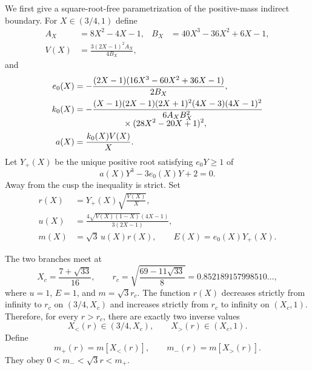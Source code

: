 \documentclass[aps,prb,preprint,superscriptaddress,nofootinbib]{revtex4-2}
\begin{document}
We first give a square-root-free parametrization of the positive-mass
indirect boundary.  For $X\in(3/4,1)$ define
\begin{align}
A_X&=8X^2-4X-1,&
B_X&=40X^3-36X^2+6X-1,\nonumber\\
V(X)&=\frac{3(2X-1)^2A_X}{4B_X},
\label{eq:V}\end{align}
and
\begin{align}
e_0(X)&=-\frac{(2X-1)(16X^3-60X^2+36X-1)}{2B_X},\label{eq:e0}\\
k_0(X)&=-\frac{(X-1)(2X-1)(2X+1)^2(4X-3)(4X-1)^2}
{6A_XB_X^2}
\nonumber\\[-2mm]
&\hspace{20mm}\times(28X^2-20X+1)^2,\label{eq:k0}\\
a(X)&=\frac{k_0(X)V(X)}{X}.
\end{align}
Let $Y_+(X)$ be the unique positive root satisfying $e_0Y\geq1$ of
\begin{equation}
a(X)Y^3-3e_0(X)Y+2=0.
\label{eq:Ycubic}
\end{equation}
Away from the cusp the inequality is strict.  Set
\begin{align}
r(X)&=Y_+(X)\sqrt{\frac{V(X)}{X}},\label{eq:rparam}\\
u(X)&=\frac{4\sqrt{V(X)(1-X)}(4X-1)}{3(2X-1)},\nonumber\\
m(X)&=\sqrt3\,u(X)r(X),\qquad E(X)=e_0(X)Y_+(X).
\label{eq:mparam}
\end{align}

The two branches meet at
\begin{equation}
X_c=\frac{7+\sqrt{33}}{16},\qquad
r_c=\sqrt{\frac{69-11\sqrt{33}}8}
=0.852189157998510\ldots,
\label{eq:cusp}
\end{equation}
where $u=1$, $E=1$, and $m=\sqrt3r_c$.  The function $r(X)$ decreases
strictly from infinity to $r_c$ on $(3/4,X_c)$ and increases strictly from
$r_c$ to infinity on $(X_c,1)$.  Therefore, for every $r>r_c$, there are
exactly two inverse values
\begin{equation}
X_<(r)\in(3/4,X_c),\qquad X_>(r)\in(X_c,1).
\end{equation}
Define
\begin{equation}
m_+(r)=m[X_<(r)],\qquad m_-(r)=m[X_>(r)].
\label{eq:mpm}
\end{equation}
They obey $0<m_-<\sqrt3r<m_+$.
\end{document}
